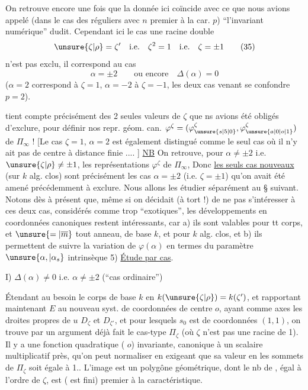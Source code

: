 On retrouve encore une fois que  la donnée ici coïncide avec ce que nous avions appelé (dans le cas des  réguliers avec $n$ premier à la car. $p$) ``l'invariant numérique'' dudit. Cependant ici le cas une racine double
\[
\unsure{\zeta|\rho}=\zeta' \quad \text{i.e.}\quad \zeta^{2}=1 \quad \text{i.e.}\quad \zeta=\pm1 \tag*{(35)}
\]
n'est pas exclu, il correspond au cas
\[
\alpha=\pm2 \qquad \text{ou encore}\quad \Delta(\alpha)=0 \tag*{(36)}
\]
($\alpha=2$ correspond à $\zeta=1$, $\alpha=-2$ à $\zeta=-1$, les deux cas venant se confondre  $p=2$).

 tient compte précisément des 2 seules valeurs de $\zeta$ que ns avions été obligés d'exclure, pour définir nos repr. géom. can. $\varphi^\zeta=(\varphi_{\unsure{s|5|0}}^\zeta,\varphi_{\unsure{a|0|o|1}}^\zeta)$ de $\Pi_\infty$ ! [Le cas $\zeta=1$, $\alpha=2$ est également distingué  comme le seul cas où il n'y ait pas de centre à distance finie .... ]
\uline{NB} On retrouve, pour $\alpha\ne\pm2$ i.e. $\unsure{\zeta|\rho}\ne\pm1$, les représentations $\varphi^\zeta$ de $\Pi_\infty$,  Donc \uline{les seuls cas nouveaux} (sur $k$ alg. clos) sont précisément les cas $\alpha=\pm2$ (i.e. $\zeta=\pm1$) qu'on avait été amené précédemment à exclure. Nous allons les étudier séparément au § suivant.
Notons dès à présent que, même si on décidait (à tort !) de ne pas s'intéresser à ces deux cas, considérés comme trop ``exotiques'', les développements en coordonnées canoniques restent intéressants, car a) ils sont valables pour tt corps, et $\unsure{=|\overline{m}}$ tout anneau, de base $k$, et   pour $k$ alg. clos, et b) ils permettent de suivre la variation de \deleted{$\unsure{\Pi|\varphi}$} $\varphi(\alpha)$ en termes du paramètre $\unsure{\alpha,|\alpha_s}$ intrinsèque 
5) \uline{Étude par cas}.

I) $\Delta(\alpha)\ne0$ \quad i.e. $\alpha\ne\pm2$ \quad (``cas ordinaire'')

Étendant au besoin le corps de base $k$ en $k(\unsure{\zeta|\rho})=k(\zeta')$, et rapportant maintenant $E$ au nouveau syst. de coordonnées de centre $o$, ayant comme axes les droites propres de $u$ $D_\zeta$ et $D_{\zeta'}$, et pour lesquels $s_0$ est de coordonnées $(1,1)$, on trouve par un argument déjà fait le cas-type $\Pi_\zeta$ (où $\zeta$ n'est pas  une racine de 1).
Il y a une fonction quadratique ( $o$) invariante, canonique à un scalaire multiplicatif près, qu'on peut normaliser en exigeant que sa valeur en les sommets de $\Pi_\zeta$ soit égale à 1.. L'image \deleted{$\Pi_\zeta$}  est un polygône géométrique, dont le nb de , égal à l'ordre de $\zeta$, est (  est fini) premier à la caractéristique.

